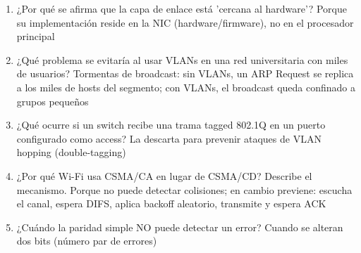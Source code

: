 \begin{enumerate}
\item ¿Por qué se afirma que la capa de enlace está 'cercana al hardware'?
Porque su implementación reside en la NIC (hardware/firmware), no en el procesador principal

\item ¿Qué problema se evitaría al usar VLANs en una red universitaria con miles de usuarios?
Tormentas de broadcast: sin VLANs, un ARP Request se replica a los miles de hosts del segmento; con VLANs, el broadcast queda confinado a grupos pequeños

\item ¿Qué ocurre si un switch recibe una trama tagged 802.1Q en un puerto configurado como access?
La descarta para prevenir ataques de VLAN hopping (double-tagging)

\item ¿Por qué Wi-Fi usa CSMA/CA en lugar de CSMA/CD? Describe el mecanismo.
Porque no puede detectar colisiones; en cambio previene: escucha el canal, espera DIFS, aplica backoff aleatorio, transmite y espera ACK

\item ¿Cuándo la paridad simple NO puede detectar un error?
Cuando se alteran dos bits (número par de errores)
















\end{enumerate}